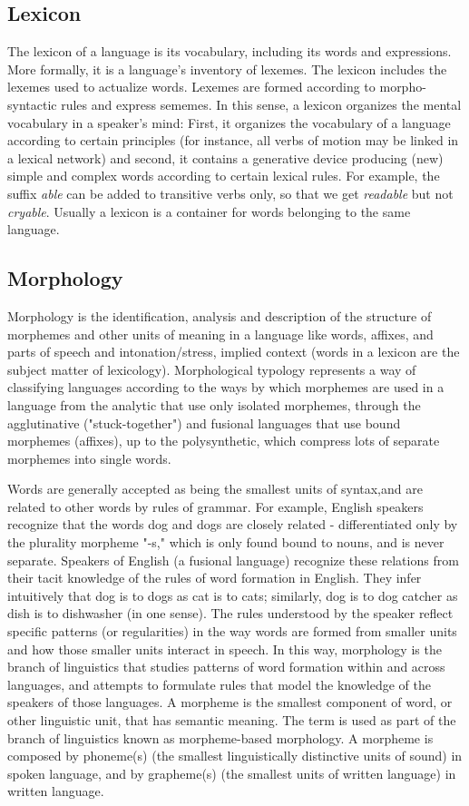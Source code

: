 \subsection{Lexicon}
The lexicon of a language is its vocabulary, including its words and expressions. More formally, it is a language's inventory of lexemes. The lexicon includes the lexemes used to actualize words. Lexemes are formed according to morpho-syntactic rules and express sememes. In this sense, a lexicon organizes the mental vocabulary in a speaker's mind: First, it organizes the vocabulary of a language according to certain principles (for instance, all verbs of motion may be linked in a lexical network) and second, it contains a generative device producing (new) simple and complex words according to certain lexical rules. For example, the suffix \emph{able} can be added to transitive verbs only, so that we get \emph{readable} but not \emph{cryable}.  Usually a lexicon is a container for words belonging to the same language.
\subsection{Morphology}
Morphology is the identification, analysis and description of the structure of morphemes and other units of meaning in a language like words, affixes, and parts of speech and intonation/stress, implied context (words in a lexicon are the subject matter of lexicology). Morphological typology represents a way of classifying languages according to the ways by which morphemes are used in a language from the analytic that use only isolated morphemes, through the agglutinative ("stuck-together") and fusional languages that use bound morphemes (affixes), up to the polysynthetic, which compress lots of separate morphemes into single words.

Words are generally accepted as being the smallest units of syntax,and are related to other words by rules of grammar. For example, English speakers recognize that the words dog and dogs are closely related - differentiated only by the plurality morpheme "-s," which is only found bound to nouns, and is never separate. Speakers of English (a fusional language) recognize these relations from their tacit knowledge of the rules of word formation in English. They infer intuitively that dog is to dogs as cat is to cats; similarly, dog is to dog catcher as dish is to dishwasher (in one sense). The rules understood by the speaker reflect specific patterns (or regularities) in the way words are formed from smaller units and how those smaller units interact in speech. In this way, morphology is the branch of linguistics that studies patterns of word formation within and across languages, and attempts to formulate rules that model the knowledge of the speakers of those languages. A morpheme is the smallest component of word, or other linguistic unit, that has semantic meaning. The term is used as part of the branch of linguistics known as morpheme-based morphology. A morpheme is composed by phoneme(s) (the smallest linguistically distinctive units of sound) in spoken language, and by grapheme(s) (the smallest units of written language) in written language.

